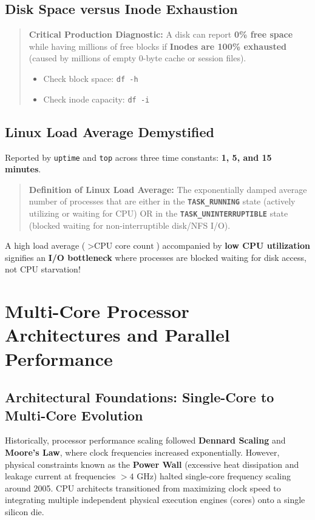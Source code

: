 \subsection{Disk Space versus Inode Exhaustion}
\begin{quote}
\textbf{Critical Production Diagnostic:} A disk can report \textbf{0\% free space} while having millions of free blocks if \textbf{Inodes are 100\% exhausted} (caused by millions of empty 0-byte cache or session files).
\begin{itemize}
    \item Check block space: \texttt{df -h}
    \item Check inode capacity: \texttt{df -i}
\end{itemize}
\end{quote}

\subsection{Linux Load Average Demystified}
Reported by \texttt{uptime} and \texttt{top} across three time constants: \textbf{1, 5, and 15 minutes}.
\begin{quote}
\textbf{Definition of Linux Load Average:} The exponentially damped average number of processes that are either in the \textbf{\texttt{TASK\_RUNNING}} state (actively utilizing or waiting for CPU) OR in the \textbf{\texttt{TASK\_UNINTERRUPTIBLE}} state (blocked waiting for non-interruptible disk/NFS I/O).
\end{quote}
A high load average ($> \text{CPU core count}$) accompanied by \textbf{low CPU utilization} signifies an \textbf{I/O bottleneck} where processes are blocked waiting for disk access, not CPU starvation!



\section{Multi-Core Processor Architectures and Parallel Performance}
\label{sec:os_multicore}

\subsection{Architectural Foundations: Single-Core to Multi-Core Evolution}
Historically, processor performance scaling followed \textbf{Dennard Scaling} and \textbf{Moore's Law}, where clock frequencies increased exponentially. However, physical constraints known as the \textbf{Power Wall} (excessive heat dissipation and leakage current at frequencies $> 4\text{ GHz}$) halted single-core frequency scaling around 2005. CPU architects transitioned from maximizing clock speed to integrating multiple independent physical execution engines (cores) onto a single silicon die.

